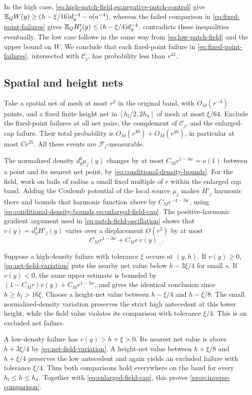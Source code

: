 In the high case, \cref{eq:high-patch-field,eq:negative-patch-control}
give $\mathbb E_QW(y)\geq(h-\xi/16)d_y^{-4}-o(a^{-4})$, whereas the failed
comparison in \cref{eq:fixed-point-failures} gives
$\mathbb E_QH'_j(y)\leq(h-\xi/4)d_y^{-4}$.
 contradicts these inequalities
eventually.  The low case follows in the same way from
\cref{eq:low-patch-field} and the upper bound on $W$.
We conclude that each fixed-point failure in
\cref{eq:fixed-point-failures}, intersected with $\mathcal C_j$, has
probability less than $r^{42}$.

\subsection{Spatial and height nets}

Take a spatial net of mesh at most $r^2$ in the original band, with
$O_M(r^{-3})$ points, and a fixed finite height net in
$[h_l/2,2h_h]$ of mesh at most $\xi/64$.
Exclude the fixed-point failures at all net pairs, the complement of
$\mathcal C_j$, and the enlarged-cap failure.  Their total probability
is $O_M(r^{39})+O_M(r^{40})$, in particular at most $Cr^{25}$.
All these events are $\mathcal F_j$-measurable.

The normalized density $d_y^6\mu_j(y)$ changes by at most
$C_Mr^{1-4w}=o(1)$ between a point and its nearest net point, by
\cref{eq:conditional-density-bounds}.  For the field, work on balls of
radius a small fixed multiple of $r$ within the enlarged cap band.
Adding the Coulomb potential of the local source $\mu_j$ makes $H'_j$
harmonic there and bounds that harmonic function above by
$C_Mr^{-4-3w}$, using
\cref{eq:conditional-density-bounds,eq:enlarged-field-cap}.
The positive-harmonic gradient argument used in
\cref{eq:patch-field-oscillation} shows that
$v(y)=d_y^4H'_j(y)$ varies over a displacement $O(r^2)$ by at most
\begin{equation}
 C_Mr^{1-3w}+C_Mr\,v(y)_-.
 \label{eq:net-field-variation}
\end{equation}

Suppose a high-density failure with tolerance $\xi$ occurs at $(y,h)$.
If $v(y)\geq0$, \cref{eq:net-field-variation} puts the nearby net value
below $h-3\xi/4$ for small $s$.  If $v(y)<0$, the same upper estimate
is bounded by
$(1-C_Mr)v(y)+C_Mr^{1-3w}$, and gives the identical conclusion since
$h\geq h_l>16\xi$.  Choose a height-net value between
$h-\xi/4$ and $h-\xi/8$.  The small normalized-density variation
preserves the strict high antecedent at this lower height, while the
field value violates its comparison with tolerance $\xi/4$.
This is an excluded net failure.

A low-density failure has $v(y)>h+\xi>0$.  Its nearest net value is above
$h+3\xi/4$ by \cref{eq:net-field-variation}.  A height-net value between
$h+\xi/8$ and $h+\xi/4$ preserves the low antecedent and again yields
an excluded failure with tolerance $\xi/4$.
Thus both comparisons hold everywhere on the band for every
$h_l\leq h\leq h_h$.  Together with
\cref{eq:enlarged-field-cap}, this proves
\cref{prop:inverse-comparison}.
